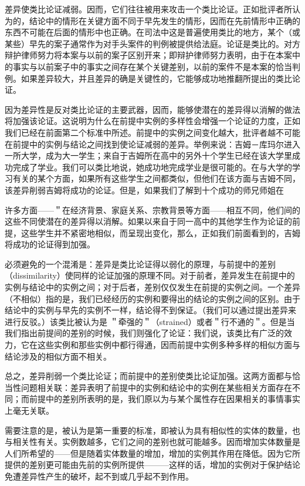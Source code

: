 差异使类比论证减弱。因而，它们往往被用来攻击一个类比论证。正如批评者所认为的，结论中的情形在关键方面不同于早先发生的情形，因而在先前情形中正确的东西不可能在后面的情形中也正确。在司法中这是普遍使用类比的地方，某个（或某些）早先的案子通常作为对手头案件的判例被提供给法庭。论证是类比的。对方辩护律师努力将本案与以前的案子区别开来；即辩护律师努力表明，由于在本案中的事实与以前案子中的事实之间存在某个关键差别，以前的案件不是本案的恰当判例。如果差异较大，并且差异的确是关键性的，它能够成功地推翻所提出的类比论证。

因为差异性是反对类比论证的主要武器，因而，能够使潜在的差异得以消解的做法将加强该论证。这说明为什么在前提中实例的多样性会增强一个论证的力度，正如我们已经在前面第二个标准中所述。前提中的实例之间变化越大，批评者越不可能在前提中的实例与结论之间找到使论证减弱的差异。举例来说：吉姆－库玛尔进入一所大学，成为大一学生；来自于吉姆所在高中的另外十个学生已经在该大学里成功完成了学业。我们可以类比地说，她成功地完成学业是很可能的。在与大学的学习有关的某个方面，如果所有这些学生之间都类似，但他们在该方面与吉姆不同，该差异削弱吉姆将成功的论证。但是，如果我们了解到十个成功的师兄师姐在

许多方面——＂在经济背景、家庭关系、宗教背景等方面——相互不同，他们间的这些不同使潜在的差异得以消解。如果以来自于同一高中的其他学生作为论证的前提，这些学生并不紧密地相似，而呈现出变化，那么，正如我们前面看到的，吉姆将成功的论证得到加强。

必须避免的一个混淆是：差异是类比论证得以弱化的原理，与前提中的差别（dissimilarity）使同样的论证加强的原理不同。对于前者，差异发生在前提中的实例与结论中的实例之间；对于后者，差别仅仅发生在前提的实例之间。一个差异（不相似）指的是，我们已经经历的实例和要得出的结论的实例之间的区别。由于结论中的实例与早先的实例不一样，结论得不到保证。（我们可以通过提出差异来进行反驳。）该类比被认为是 ＂牵强的＂（strained）或者＂行不通的＂。但是当我们指出前提间的差别的时候，我们则强化了论证：我们说，该类比有广泛的效力，它在这些实例和那些实例中都行得通，因而前提中实例多种多样的相似方面与结论涉及的相似方面不相关。

总之，差异削弱一个类比论证；而前提中的差别使类比论证加强。这两方面都与恰当性问题相关联：差异表明了前提中的实例和结论中的实例在某些相关方面存在不同；而前提中的差别所表明的是，我们原以为与某个属性存在因果相关的事情事实上毫无关联。

需要注意的是，被认为是第一重要的标准，即被认为具有相似性的实体的数量，也与相关性有关。实例数越多，它们之间的差别也就可能越多。因而增加实体数量是人们所希望的——但是随着实体数量的增加，增加的实例其作用在降低。因为它所提供的差别更可能由先前的实例所提供———这样的话，增加的实例对于保护结论免遭差异性产生的破坏，起不到或几乎起不到作用。

